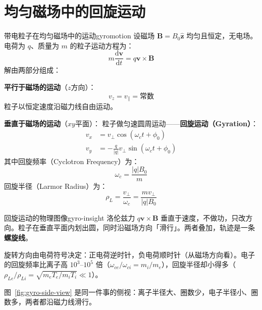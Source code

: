 \documentclass[12pt,a4paper,openany,oneside]{book}
\newcommand{\diffmarktext}[1]{%
  \textcolor{coverMid!80}{\rule[-0.1em]{2pt}{0.9em}}\,%
  \textcolor{coverMid}{\footnotesize\textbf{[#1]}}%
}
\newcommand{\difficulty}[1]{\marginnote{\raggedright\diffmarktext{#1}}}
\newcommand{\diff}{\mathrm{d}}
\newcommand{\vect}[1]{\bm{#1}}
\newcommand{\unitvec}[1]{\hat{\vect{#1}}}
\begin{document}
\section{均匀磁场中的回旋运动}\difficulty{基础}
\label{sec:ch3-gyration}

\begin{theorem}{带电粒子在均匀磁场中的运动}{gyromotion}
设磁场 $\vect{B} = B_0\unitvec{z}$ 均匀且恒定，无电场。电荷为 $q$、质量为 $m$ 的粒子运动方程为：
\[
m\frac{\diff\vect{v}}{\diff t} = q\vect{v}\times\vect{B}
\]
解由两部分组成：

\textbf{平行于磁场的运动}（$z$方向）：
\[
v_z = v_{\parallel} = \text{常数}
\]
粒子以恒定速度沿磁力线自由运动。

\textbf{垂直于磁场的运动}（$xy$平面）：
粒子做匀速圆周运动——\textbf{回旋运动（Gyration）}：
\begin{align*}
v_x &= v_\perp \cos(\omega_c t + \phi_0) \\
v_y &= -\frac{q}{|q|} v_\perp \sin(\omega_c t + \phi_0)
\end{align*}
其中回旋频率（Cyclotron Frequency）为：
\[
\omega_c = \frac{|q|B_0}{m}
\]
回旋半径（Larmor Radius）为：
\[
\rho_L = \frac{v_\perp}{\omega_c} = \frac{m v_\perp}{|q|B_0}
\]
\end{theorem}

\begin{insight}{回旋运动的物理图像}{gyro-insight}
洛伦兹力 $q\vect{v}\times\vect{B}$ 垂直于速度，不做功，只改方向。粒子在垂直平面内划出圆，同时沿磁场方向「滑行」。两者叠加，轨迹是一条\textbf{螺旋线}。

旋转方向由电荷符号决定：正电荷逆时针，负电荷顺时针（从磁场方向看）。电子的回旋频率比离子高 $10^3$--$10^5$ 倍（$\omega_{ce}/\omega_{ci} = m_i/m_e$），回旋半径却小得多（$\rho_{Le}/\rho_{Li} = \sqrt{m_e T_e/m_i T_i} \ll 1$）。
\end{insight}

图~\ref{fig:gyro-side-view} 是同一件事的侧视：离子半径大、圈数少，电子半径小、圈数多，两者都沿磁力线滑行。
\end{document}
